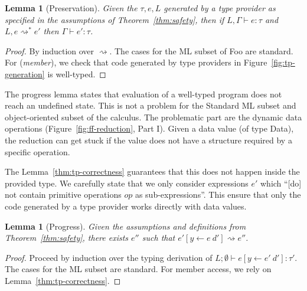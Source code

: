\documentclass[pldi-cameraready]{sigplanconf-pldi16}
\newcommand{\ident}[1]{\textnormal{\sffamily #1}}
\newcommand{\reduce}{\rightsquigarrow}
\newtheorem{lemma}[theorem]{Lemma}
\begin{document}
\begin{lemma}[Preservation]
\label{thm:rs-preservation}
Given the $\tau, e, L$ generated by a type provider as specified in
the assumptions of Theorem~\ref{thm:safety}, then if $L, \Gamma \vdash e : \tau$ and
$L, e \reduce^{*} e'$ then $\Gamma \vdash e' : \tau$.
\end{lemma}
\begin{proof}
By induction over $\reduce$. The cases for the ML subset of Foo
are standard. For (\emph{member}), we check that code generated by type providers
in Figure~\ref{fig:tp-generation} is well-typed.
\end{proof}

\noindent
The progress lemma states that evaluation of a well-typed program does not reach an undefined state.
This is not a problem for the Standard ML \cite{sml} subset and object-oriented subset \cite{fwjava} of the calculus. The
problematic part are the dynamic data operations (Figure~\ref{fig:ff-reduction}, Part I). Given a data
value (of type \ident{Data}), the reduction can get stuck if the value does not have a structure
required by a specific operation.

The Lemma~\ref{thm:tp-correctness} guarantees that this does not happen inside the provided type.
We carefully state that we only consider expressions $e'$ which
``[do] not contain primitive operations $op$ as sub-expressions''. This ensure that only
the code generated by a type provider works directly with data values.

\begin{lemma}[Progress]
\label{thm:rs-progress}
Given the assumptions and definitions from Theorem~\ref{thm:safety}, there exists $e''$ such that
$e'[y\leftarrow e~d'] \reduce e''$.
\end{lemma}
\begin{proof}
Proceed by induction over the typing derivation of $L; \emptyset \vdash e[y\leftarrow e'~d'] : \tau'$.
The cases for the ML subset are standard. For member access, we rely on Lemma~\ref{thm:tp-correctness}.
\end{proof}



%
%
\end{document}
